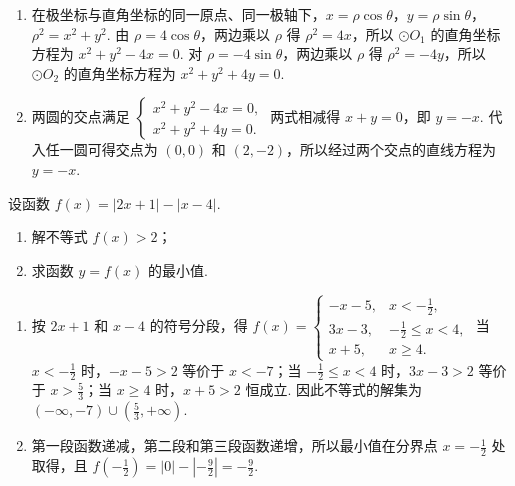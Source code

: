\begin{solution}
\begin{enumerate}
\item 在极坐标与直角坐标的同一原点、同一极轴下，\(x=\rho\cos\theta\)，\(y=\rho\sin\theta\)，\(\rho^2=x^2+y^2\). 由 \(\rho=4\cos\theta\)，两边乘以 \(\rho\) 得 \(\rho^2=4x\)，所以 \(\odot O_1\) 的直角坐标方程为 \(x^2+y^2-4x=0\). 对 \(\rho=-4\sin\theta\)，两边乘以 \(\rho\) 得 \(\rho^2=-4y\)，所以 \(\odot O_2\) 的直角坐标方程为 \(x^2+y^2+4y=0\).
\item 两圆的交点满足
\(\begin{cases}
x^2+y^2-4x=0,\\
x^2+y^2+4y=0.
\end{cases}\)
两式相减得 \(x+y=0\)，即 \(y=-x\). 代入任一圆可得交点为 \((0,0)\) 和 \((2,-2)\)，所以经过两个交点的直线方程为 \(y=-x\).
\end{enumerate}
\end{solution}

\begin{problem}
设函数 \( f(x) = |2x + 1| - |x - 4| \).

\begin{enumerate}
\item 解不等式 \( f(x) > 2 \)；
\item 求函数 \( y = f(x) \) 的最小值.
\end{enumerate}
\end{problem}

\begin{solution}
\begin{enumerate}
\item 按 \(2x+1\) 和 \(x-4\) 的符号分段，得
\(f(x)=\begin{cases}
-x-5,&x<-\frac{1}{2},\\
3x-3,&-\frac{1}{2}\leqslant x<4,\\
x+5,&x\geqslant4.
\end{cases}\)
当 \(x<-\frac{1}{2}\) 时，\(-x-5>2\) 等价于 \(x<-7\)；当 \(-\frac{1}{2}\leqslant x<4\) 时，\(3x-3>2\) 等价于 \(x>\frac{5}{3}\)；当 \(x\geqslant4\) 时，\(x+5>2\) 恒成立. 因此不等式的解集为 \(\left(-\infty,-7\right)\cup\left(\frac{5}{3},+\infty\right)\).
\item 第一段函数递减，第二段和第三段函数递增，所以最小值在分界点 \(x=-\frac{1}{2}\) 处取得，且
\(f(-\frac{1}{2})=\left|0\right|-\left|-\frac{9}{2}\right|=-\frac{9}{2}\).
\end{enumerate}
\end{solution}
